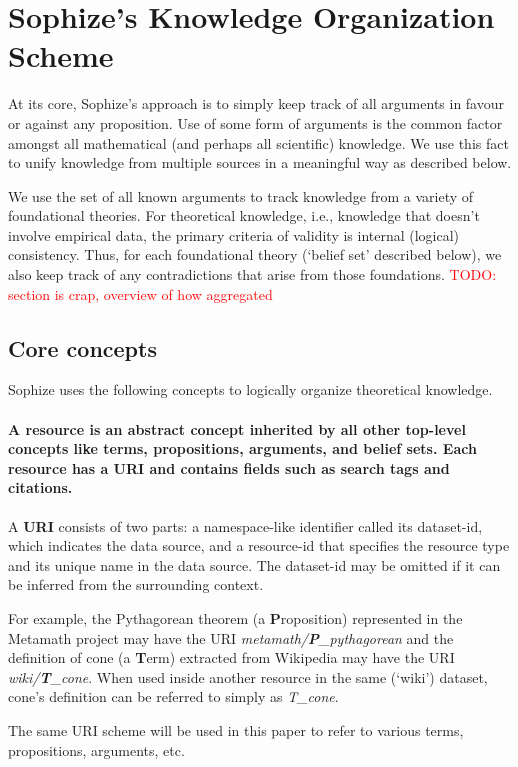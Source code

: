\documentclass[a4paper]{article}
\newcommand\todo[1]{\textcolor{red}{TODO: #1}}
\begin{document}
\section{Sophize's Knowledge Organization Scheme}
At its core, Sophize's approach is to simply keep track of all arguments in favour or against any proposition. Use of some form of arguments is the common factor amongst all mathematical (and perhaps all scientific) knowledge. We use this fact to unify knowledge from multiple sources in a meaningful way as described below.

We use the set of all known arguments to track knowledge from a variety of foundational theories. For theoretical knowledge, i.e., knowledge that doesn't involve empirical data, the primary criteria of validity is internal (logical) consistency. Thus, for each foundational theory (`belief set' described below), we also keep track of any contradictions that arise from those foundations.
\todo{section is crap, overview of how aggregated}

\subsection{Core concepts}
Sophize uses the following concepts to logically organize theoretical knowledge.

\paragraph{A \textbf{resource} is an abstract concept inherited by all other top-level concepts like terms, propositions, arguments, and belief sets. Each resource has a URI and contains fields such as search tags and citations.}

A \textbf{URI} consists of two parts: a namespace-like identifier called its dataset-id, which indicates the data source, and a resource-id that specifies the resource type and its unique name in the data source. The dataset-id may be omitted if it can be inferred from the surrounding context.

For example, the Pythagorean theorem (a \textbf{P}roposition) represented in the Metamath project may have the URI \emph{metamath/\textbf{P}\_pythagorean} and the definition of cone (a \textbf{T}erm) extracted from Wikipedia may have the URI \emph{wiki/\textbf{T}\_cone}. When used inside another resource in the same (`wiki') dataset, cone's definition can be referred to simply as \emph{T\_cone}.

The same URI scheme will be used in this paper to refer to various terms, propositions, arguments, etc.
\end{document}
